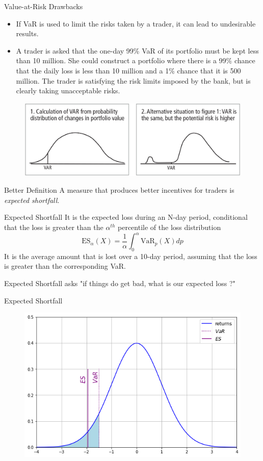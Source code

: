 \documentclass{beamer}
\begin{document}
\begin{frame}{Value-at-Risk Drawbacks}
  \begin{itemize}
  \item If VaR is used to limit the risks taken by a trader, it can lead to undesirable results.
  \item A trader is asked that the one-day 99\% VaR of its portfolio must be kept less than 10 million. She could construct a portfolio where there is a 99\% chance that the daily loss is less than 10 million and a 1\% chance that it is 500 million. The trader is satisfying the risk limits imposed by the bank, but is clearly taking unacceptable risks.
  \end{itemize}
  \begin{figure}[h]
    \begin{center}
      \includegraphics[width=0.7\linewidth]{var_badvar}
    \end{center}
  \end{figure}
\end{frame}

\begin{frame}{Better Definition}
  A measure that produces better incentives for traders is \emph{expected shortfall}.
  \begin{block}{Expected Shortfall}
    It is the expected loss during an N-day period, conditional that the loss is greater than the $\alpha^{th}$ percentile of the loss distribution
    \begin{equation*}
      \textrm{ES}_{\alpha}(X) = \frac{1}{\alpha}\int_0^\alpha \textrm{VaR}_p(X) dp
    \end{equation*}
It is the average amount that is lost over a 10-day period, assuming that the loss is greater than the corresponding VaR.

Expected Shortfall asks "if things do get bad, what is our expected loss ?"
\end{block}
\end{frame}

\begin{frame}{Expected Shortfall}
  \begin{figure}[h]
    \begin{center}
      \includegraphics[width=0.5\linewidth]{es}
    \end{center}
  \end{figure}
\end{frame}
\end{document}
